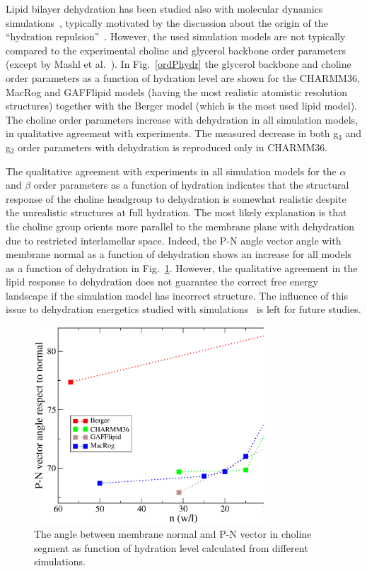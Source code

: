 \documentclass[pre,aps,floatfix,authordate1-4,twocolumn]{revtex4-1}
\begin{document}
Lipid bilayer dehydration has been studied also with molecular dynamics simulations~\cite{mashl01,pertsin05,pertsin07,eun09,eun10,schneck12},
typically motivated by the  discussion about the origin of the ``hydration repulsion''~\cite{israelachvili,israelachvili96,sparr11}.
However, the used simulation models are not typically compared to the experimental choline and glycerol backbone
order parameters (except by Mashl et al.~\cite{mashl01}).
In Fig.~\ref{ordPhydr} the glycerol backbone and choline order parameters as a function of hydration level are shown 
for the CHARMM36, MacRog and GAFFlipid models (having the most realistic atomistic resolution structures) together with the Berger model 
(which is the most used lipid model). The choline order parameters increase with dehydration in all simulation
models, in qualitative agreement with experiments. 
The measured decrease in both g$_3$ and g$_2$ order parameters with dehydration is reproduced only in CHARMM36.

The qualitative agreement with experiments in all simulation models for the $\alpha$ and $\beta$ order parameters  
as a function of hydration indicates that the structural response of the choline headgroup to dehydration is somewhat realistic
despite the unrealistic structures at full hydration. 
The most likely explanation is that the choline group
orients more parallel to the membrane plane with dehydration due to restricted interlamellar space. 
Indeed, the P-N angle vector angle with membrane normal as a function of dehydration shows an increase for
all models as a function of dehydration in Fig.~\ref{PNangle}.
However, the qualitative agreement in the lipid response to dehydration does not guarantee the correct 
free energy landscape if the simulation model has incorrect structure. The influence of this issue to 
dehydration energetics studied with simulations~\cite{eun09,schneck12} is left for future studies.
\begin{figure}[]
  \centering
  \includegraphics[width=8.6cm]{PNangles.eps}

  \caption{\label{PNangle}
    The angle between membrane normal and P-N vector in choline segment as function of
    hydration level calculated from different simulations.
  }
\end{figure}
\end{document}

